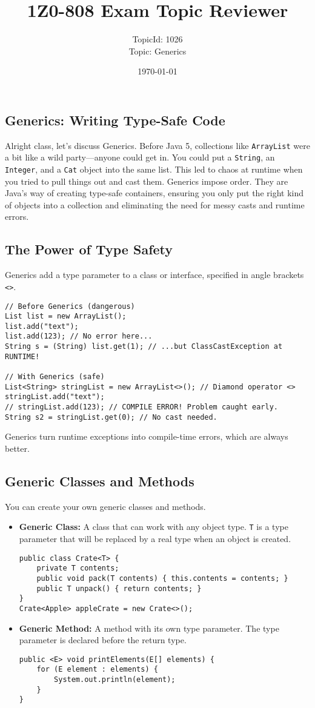 \documentclass[12pt]{article}
\title{\textbf{1Z0-808 Exam Topic Reviewer}}
\author{TopicId: 1026 \\ Topic: Generics}
\date{\today}
\begin{document}
\maketitle
\newpage\begin{enumerate}[label=(\arabic*)]
\section*{Generics: Writing Type-Safe Code}
Alright class, let's discuss Generics. Before Java 5, collections like \texttt{ArrayList} were a bit like a wild party—anyone could get in. You could put a \texttt{String}, an \texttt{Integer}, and a \texttt{Cat} object into the same list. This led to chaos at runtime when you tried to pull things out and cast them. Generics impose order. They are Java's way of creating type-safe containers, ensuring you only put the right kind of objects into a collection and eliminating the need for messy casts and runtime errors.

\subsection{The Power of Type Safety}
Generics add a type parameter to a class or interface, specified in angle brackets \texttt{<>}.
\begin{verbatim}
// Before Generics (dangerous)
List list = new ArrayList();
list.add("text");
list.add(123); // No error here...
String s = (String) list.get(1); // ...but ClassCastException at RUNTIME!

// With Generics (safe)
List<String> stringList = new ArrayList<>(); // Diamond operator <>
stringList.add("text");
// stringList.add(123); // COMPILE ERROR! Problem caught early.
String s2 = stringList.get(0); // No cast needed.
\end{verbatim}
Generics turn runtime exceptions into compile-time errors, which are always better.

\subsection{Generic Classes and Methods}
You can create your own generic classes and methods.
\begin{itemize}
    \item \textbf{Generic Class:} A class that can work with any object type. \texttt{T} is a type parameter that will be replaced by a real type when an object is created.
\begin{verbatim}
public class Crate<T> {
    private T contents;
    public void pack(T contents) { this.contents = contents; }
    public T unpack() { return contents; }
}
Crate<Apple> appleCrate = new Crate<>();
\end{verbatim}
    \item \textbf{Generic Method:} A method with its own type parameter. The type parameter is declared before the return type.
\begin{verbatim}
public <E> void printElements(E[] elements) {
    for (E element : elements) {
        System.out.println(element);
    }
}
\end{verbatim}
\end{itemize}


\end{enumerate}
\end{document}
